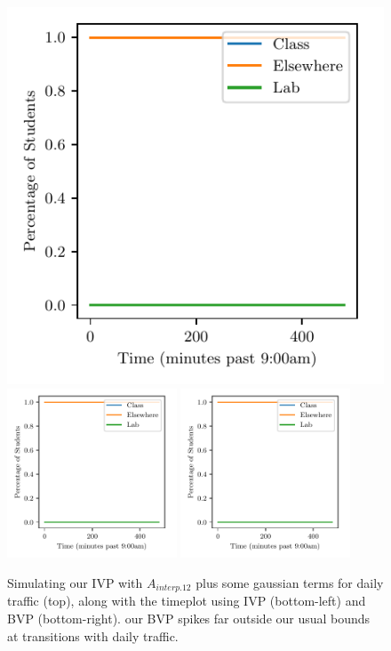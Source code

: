 \documentclass[11pt]{amsart}
\begin{document}
\begin{figure}[htp]
    \centering
    \includegraphics[width=1\textwidth]{temp.pdf}\hfill
    \includegraphics[width=0.45\textwidth]{temp.pdf}\hfill
    \includegraphics[width=0.45\textwidth]{temp.pdf}\hfill

    \caption{Simulating our IVP with $A_{interp.12}$ plus some gaussian terms for daily traffic (top), along with the timeplot using IVP (bottom-left) and BVP (bottom-right).
    our BVP spikes far outside our usual bounds at transitions with daily traffic.}
    \label{fig:daywise_alpha}
\end{figure}
\end{document}
